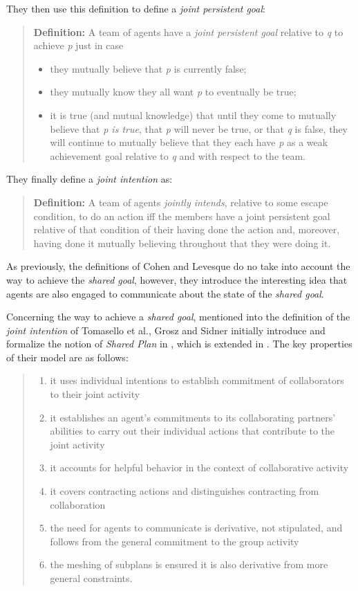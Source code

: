 \documentclass[english,a4paper,11pt,twoside]{StyleThese}
\begin{document}
They then use this definition to define a \textit{joint persistent goal}:
\begin{quote}
\textbf{Definition: } A team of agents have a \textit{joint persistent goal} relative to \textit{q} to achieve \textit{p} just in case
\begin{itemize}
\item they mutually believe that \textit{p} is currently false;
\item they mutually know they all want \textit{p} to eventually be true;
\item it is true (and mutual knowledge) that until they come to mutually believe that \textit{p is true}, that \textit{p} will never be true, or that \textit{q} is false, they will continue to mutually believe that they each have \textit{p} as a weak achievement goal relative to \textit{q} and with respect to the team.
\end{itemize}
\end{quote}

They finally define a \textit{joint intention} as:
\begin{quote}
\textbf{Definition:} A team of agents \textit{jointly intends}, relative to some escape condition, to do an action iff the members have a joint persistent goal relative of that condition of their having done the action and, moreover, having done it mutually believing throughout that they were doing it.
\end{quote}

As previously, the definitions of Cohen and Levesque do no take into account the way to achieve the \textit{shared goal}, however, they introduce the interesting idea that agents are also engaged to communicate about the state of the \textit{shared goal}.

Concerning the way to achieve a \textit{shared goal}, mentioned into the definition of the \textit{joint intention} of Tomasello et al., Grosz and Sidner initially introduce and formalize the notion of \textit{Shared Plan} in \cite{grosz1988plans}, which is extended in \cite{grosz1999evolution}. The key properties of their model are as follows:
\begin{quote}
\begin{enumerate}
\item it uses individual intentions to establish commitment of collaborators to their joint activity
\item it establishes an agent's commitments to its collaborating partners' abilities to carry out their
individual actions that contribute to the joint activity
\item it accounts for helpful behavior in the context of collaborative activity
\item it covers contracting actions and distinguishes contracting from collaboration
\item the need for agents to communicate is derivative, not stipulated, and follows from the general
commitment to the group activity
\item the meshing of subplans is ensured it is also derivative from more general constraints.
\end{enumerate}
\end{quote}
\end{document}
